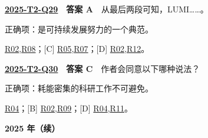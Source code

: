 \documentclass[11pt,a4paper]{article}
\begin{document}
\par\smallskip
{}\label{idx-2025-T2-Q29}
\noindent\textbf{\href{https://zj139.github.io/math-notes/english/b852b5bb77b21d41f0543171/\#q29}{2025-T2-Q29}　答案 A}　从最后两段可知，LUMI……。\par\nopagebreak
\noindent 正确项：是可持续发展努力的一个典范。\par\nopagebreak
\noindent [B] \hyperref[cat-R02]{R02},\hyperref[cat-R08]{R08}；[C] \hyperref[cat-R05]{R05},\hyperref[cat-R07]{R07}；[D] \hyperref[cat-R02]{R02},\hyperref[cat-R12]{R12}。
\par\smallskip
{}\label{idx-2025-T2-Q30}
\noindent\textbf{\href{https://zj139.github.io/math-notes/english/b852b5bb77b21d41f0543171/\#q30}{2025-T2-Q30}　答案 C}　作者会同意以下哪种说法？\par\nopagebreak
\noindent 正确项：耗能密集的科研工作不可避免。\par\nopagebreak
\noindent [A] \hyperref[cat-R04]{R04}；[B] \hyperref[cat-R02]{R02},\hyperref[cat-R09]{R09}；[D] \hyperref[cat-R04]{R04},\hyperref[cat-R11]{R11}。
\par\smallskip
\clearpage\noindent\textbf{2025 年（续）}\par
\end{document}
